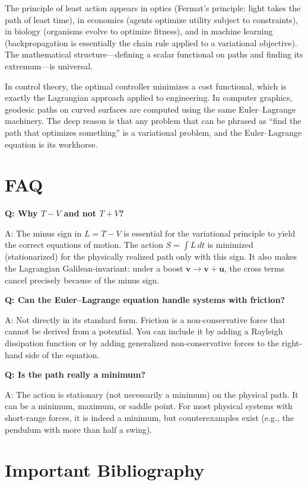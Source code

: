 \documentclass[11pt,openright]{book}
\begin{document}
The principle of least action appears in optics (Fermat's principle: light takes the path of least time), in economics (agents optimize utility subject to constraints), in biology (organisms evolve to optimize fitness), and in machine learning (backpropagation is essentially the chain rule applied to a variational objective). The mathematical structure---defining a scalar functional on paths and finding its extremum---is universal.

In control theory, the optimal controller minimizes a cost functional, which is exactly the Lagrangian approach applied to engineering. In computer graphics, geodesic paths on curved surfaces are computed using the same Euler--Lagrange machinery. The deep reason is that any problem that can be phrased as ``find the path that optimizes something'' is a variational problem, and the Euler--Lagrange equation is its workhorse.

\section*{FAQ}

\textbf{Q: Why $T - V$ and not $T + V$?}

A: The minus sign in $L = T - V$ is essential for the variational principle to yield the correct equations of motion. The action $S = \int L\,dt$ is minimized (stationarized) for the physically realized path only with this sign. It also makes the Lagrangian Galilean-invariant: under a boost $\mathbf{v} \to \mathbf{v} + \mathbf{u}$, the cross terms cancel precisely because of the minus sign.

\textbf{Q: Can the Euler--Lagrange equation handle systems with friction?}

A: Not directly in its standard form. Friction is a non-conservative force that cannot be derived from a potential. You can include it by adding a Rayleigh dissipation function or by adding generalized non-conservative forces to the right-hand side of the equation.

\textbf{Q: Is the path really a minimum?}

A: The action is stationary (not necessarily a minimum) on the physical path. It can be a minimum, maximum, or saddle point. For most physical systems with short-range forces, it is indeed a minimum, but counterexamples exist (e.g., the pendulum with more than half a swing).
\section*{Important Bibliography}
\end{document}
